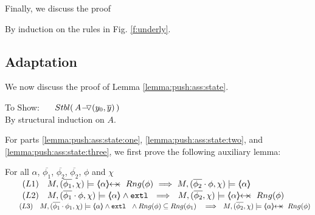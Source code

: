\vspace{1cm} Finally, we discuss the proof


\newcommand{\SP}{$\strut \ \ \ \ $}

By induction on the rules in Fig. \ref{f:underly}.

\completeProof 

\subsection{Adaptation}
\label{appendix:adaptation}
 
 
 We now discuss the proof of Lemma \ref{lemma:push:ass:state}.

 \vspace{0.5cm}
 
$~$ \\
To Show: \ \ \  $\Stable{\,  \PushASLong {(y_0,\overline y)} A\, }$
\\
By structural induction on $A$.\\
\completeProofSub

\vspace{1cm}

For parts \ref{lemma:push:ass:state:one},  \ref{lemma:push:ass:state:two}, and  \ref{lemma:push:ass:state:three}, we first prove the following auxiliary lemma:

\begin{auxLemma}
\label{l:push:pop:aux}
For all $\alpha$,   $\overline {\phi_1}$, $\overline {\phi_2}$, $\overline {\phi_2}$, $\phi$ and $\chi$\\
$\strut ~ \ \ \ \ \ (L1)\ \ \    M, (\overline {\phi_1},\chi) \models \protectedFrom \alpha {Rng(\phi)} \ \Longrightarrow \ M, (\overline {\phi_2}\cdot \phi,\chi) \models \inside \alpha$
\\
$\strut ~ \ \ \ \ \ (L2)\ \ \    M, (\overline {\phi_1}\cdot\phi,\chi) \models \inside \alpha   \wedge \extThis \ \ \Longrightarrow \ \ M, (\overline {\phi_2},\chi) \models \protectedFrom \alpha {Rng(\phi)} $\\
$\strut ~ \ \ \ \ \ (L3)\ \ \    M, (\overline {\phi_1}\cdot \phi_1,\chi) \models \inside \alpha   \wedge \extThis \ \ \wedge Rng(\phi)\subseteq Rng(\phi_1)\ \ \  \Longrightarrow \ \ M, (\overline {\phi_2},\chi) \models \protectedFrom \alpha {Rng(\phi)} $
\\\end{auxLemma}

